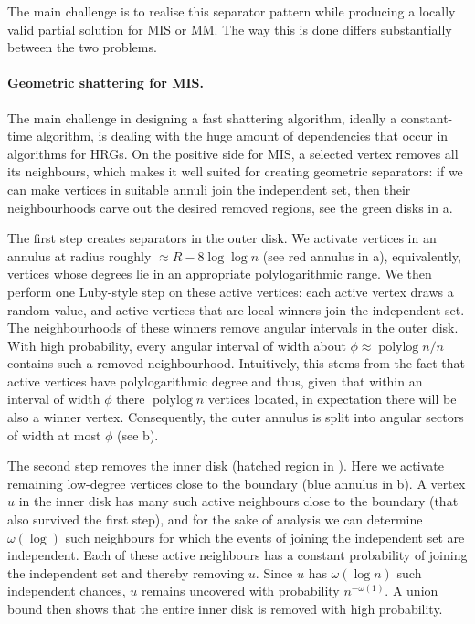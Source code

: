 \documentclass[letterpaper,11pt]{article}
\newcommand{\1}{\mathbb I}
\DeclareMathOperator{\polylog}{polylog}
\begin{document}
The main challenge is to realise this separator pattern while producing a locally valid partial solution for MIS or MM. The way this is done differs substantially between the two problems.

\paragraph{Geometric shattering for MIS.}
The main challenge in designing a fast shattering algorithm, ideally a constant-time algorithm, is dealing with the huge amount of dependencies that occur in algorithms for HRGs. On the positive side for MIS, a selected vertex removes all its neighbours, which makes it well suited for creating geometric separators: if we can make vertices in suitable annuli join the independent set, then their neighbourhoods carve out the desired removed regions, see the {green} disks in a. 

The first step creates separators in the outer disk. 
We activate vertices in an annulus at radius roughly $\approx R-8\log\log n$ (see red annulus in a), equivalently, vertices whose degrees lie in an appropriate polylogarithmic range. We then perform one Luby-style step on these active vertices: each active vertex draws a random value, and active vertices that are local winners join the independent set. The neighbourhoods of these winners remove angular intervals in the outer disk. With high probability, every angular interval of width about $\phi \approx \polylog n /n$ contains such a removed neighbourhood. Intuitively, this stems from the fact that active vertices have polylogarithmic degree and thus, given that within an interval of width $\phi$ there $\polylog n$ vertices located, in expectation there will be also a winner vertex. Consequently, the outer annulus is split into angular sectors of width at most $\phi$ (see b).

The second step removes the inner disk (hatched region in ). Here we activate remaining low-degree vertices close to the boundary (blue annulus in b). A vertex $u$ in the inner disk has many such active neighbours close to the boundary (that also survived the first step), and for the sake of analysis we can determine $\omega(\log )$ such neighbours for which the events of joining the independent set are independent. Each of these active neighbours has a constant probability of joining the independent set and thereby removing $u$. Since $u$ has $\omega(\log n)$ such independent chances, $u$ remains uncovered with probability $n^{-\omega(1)}$. A union bound then shows that the entire inner disk is removed with high probability.
\end{document}

